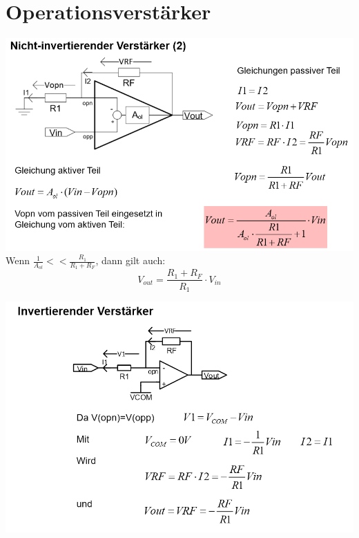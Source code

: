 \section{Operationsverstärker}


\includegraphics[width=\linewidth]{Images/opamp_negatives_feedback}
Wenn $\frac{1}{A_{ol}} << \frac{R_1}{R_1 + R_F}$, dann gilt auch:
\[
V_{out} = \frac{R_1 + R_F}{R_1} \cdot V_{in}
\]

\includegraphics[width=\linewidth]{Images/opamp_invertierendpng}

